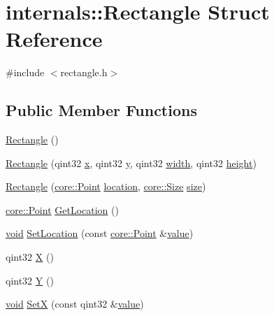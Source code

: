 \hypertarget{structinternals_1_1_rectangle}{\section{internals\-:\-:Rectangle Struct Reference}
\label{structinternals_1_1_rectangle}
}


{\ttfamily \#include $<$rectangle.\-h$>$}

\subsection*{Public Member Functions}
\begin{DoxyCompactItemize}
\item 
\hyperlink{group___o_p_map_widget_ga03611c46b536e7a99cbdbc186e3dff19}{Rectangle} ()
\item 
\hyperlink{group___o_p_map_widget_ga4c4f49dc7eb25d83f3289fe29b2b4cd1}{Rectangle} (qint32 \hyperlink{glext_8h_a1db9d104e3c2128177f26aff7b46982f}{x}, qint32 \hyperlink{glext_8h_a42315f3ed8fff752bb47fd782309fcfc}{y}, qint32 \hyperlink{glext_8h_a76aaa5c50746272e7d2de9aece921757}{width}, qint32 \hyperlink{glext_8h_ae23e72c69f79d0aa647aa7929ef3f232}{height})
\item 
\hyperlink{group___o_p_map_widget_ga1d494138f0b6c0ba9d64a3b5dd0e076c}{Rectangle} (\hyperlink{structcore_1_1_point}{core\-::\-Point} \hyperlink{glext_8h_a6f0165ed903f22b8bb600c3e0b628e73}{location}, \hyperlink{structcore_1_1_size}{core\-::\-Size} \hyperlink{glext_8h_a014d89bd76f74ef3a29c8f04b473eb76}{size})
\item 
\hyperlink{structcore_1_1_point}{core\-::\-Point} \hyperlink{group___o_p_map_widget_ga9dcbcbee1c0e91b3dfd3338a9a464d84}{Get\-Location} ()
\item 
\hyperlink{group___u_a_v_objects_plugin_ga444cf2ff3f0ecbe028adce838d373f5c}{void} \hyperlink{group___o_p_map_widget_ga7d71ff294aa5fdf0878e8c79a8b07725}{Set\-Location} (const \hyperlink{structcore_1_1_point}{core\-::\-Point} \&\hyperlink{glext_8h_aa0e2e9cea7f208d28acda0480144beb0}{value})
\item 
qint32 \hyperlink{group___o_p_map_widget_ga95fc9b3e998dac5bc018066e5f59abf3}{X} ()
\item 
qint32 \hyperlink{group___o_p_map_widget_ga6ca37907a3c1adef88ec18719e426391}{Y} ()
\item 
\hyperlink{group___u_a_v_objects_plugin_ga444cf2ff3f0ecbe028adce838d373f5c}{void} \hyperlink{group___o_p_map_widget_ga22ba95479846a429af53aa19f149f5f3}{Set\-X} (const qint32 \&\hyperlink{glext_8h_aa0e2e9cea7f208d28acda0480144beb0}{value})

\end{DoxyCompactItemize}

